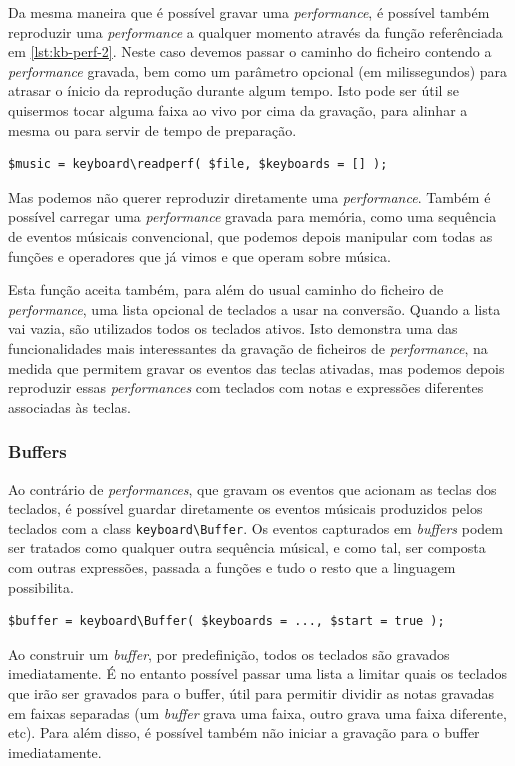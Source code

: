 Da mesma maneira que é possível gravar uma \textit{performance}, é possível também reproduzir uma \textit{performance} a qualquer momento através da função referênciada em \ref{lst:kb-perf-2}. Neste caso devemos passar o caminho do ficheiro contendo a \textit{performance} gravada, bem como um parâmetro opcional (em milissegundos) para atrasar o ínicio da reprodução durante algum tempo. Isto pode ser útil se quisermos tocar alguma faixa ao vivo por cima da gravação, para alinhar a mesma ou para servir de tempo de preparação.

\begin{lstlisting}[caption={Conversão de uma \textit{performance} numa sequência de eventos músicais},label={lst:kb-perf-3}]
$music = keyboard\readperf( $file, $keyboards = [] );
\end{lstlisting}

Mas podemos não querer reproduzir diretamente uma \textit{performance}. Também é possível carregar uma \textit{performance} gravada para memória, como uma sequência de eventos músicais convencional, que podemos depois manipular com todas as funções e operadores que já vimos e que operam sobre música.

Esta função aceita também, para além do usual caminho do ficheiro de \textit{performance}, uma lista opcional de teclados a usar na conversão. Quando a lista vai vazia, são utilizados todos os teclados ativos. Isto demonstra uma das funcionalidades mais interessantes da gravação de ficheiros de \textit{performance}, na medida que permitem gravar os eventos das teclas ativadas, mas podemos depois reproduzir essas \textit{performances} com teclados com notas e expressões diferentes associadas às teclas.



\subsubsection{Buffers}
Ao contrário de \textit{performances}, que gravam os eventos que acionam as teclas dos teclados, é possível guardar diretamente os eventos músicais produzidos pelos teclados com a class \texttt{keyboard\textbackslash{}Buffer}. Os eventos capturados em \textit{buffers} podem ser tratados como qualquer outra sequência músical, e como tal, ser composta com outras expressões, passada a funções e tudo o resto que a linguagem possibilita. 

\begin{lstlisting}[caption={Instanciação de um \textit{buffer}}]
$buffer = keyboard\Buffer( $keyboards = ..., $start = true );
\end{lstlisting}
Ao construir um \textit{buffer}, por predefinição, todos os teclados são gravados imediatamente. É no entanto possível passar uma lista a limitar quais os teclados que irão ser gravados para o buffer, útil para permitir dividir as notas gravadas em faixas separadas (um \textit{buffer} grava uma faixa, outro grava uma faixa diferente, etc). Para além disso, é possível também não iniciar a gravação para o buffer imediatamente. 

